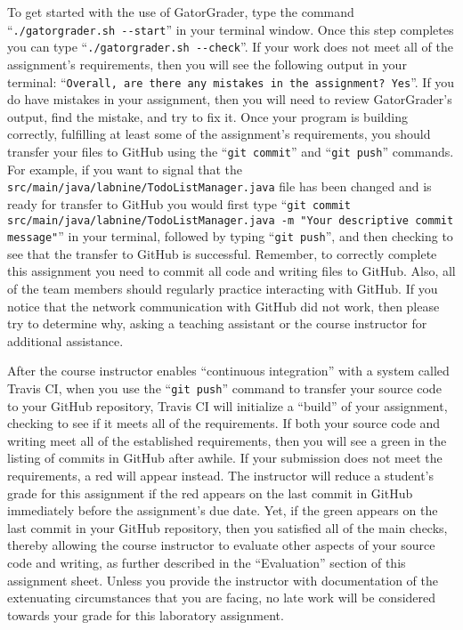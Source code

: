 \documentclass[11pt]{article}
\newcommand{\mainprogramsource}{\lstinline{src/main/java/labnine/TodoListManager.java}}
\newcommand{\gatorgraderstart}{\command{./gatorgrader.sh --start}}
\newcommand{\gatorgradercheck}{\command{./gatorgrader.sh --check}}
\newcommand{\gitcommit}{\command{git commit}}
\newcommand{\gitpush}{\command{git push}}
\newcommand{\gitcommitmainprogram}{\command{git commit src/main/java/labnine/TodoListManager.java -m "Your
descriptive commit message"}}
\newcommand{\command}[1]{``\lstinline{#1}''}
\newcommand{\step}[1]{``{#1}''}
\newcommand{\checkmark}{\ding{51}}
\newcommand{\naughtmark}{\ding{55}}
\begin{document}
To get started with the use of GatorGrader, type the command \gatorgraderstart{} in your terminal window. Once this step
completes you can type \gatorgradercheck{}. If your work does not meet all of the assignment's requirements, then you
will see the following output in your terminal: \command{Overall, are there any mistakes in the assignment? Yes}. If you
do have mistakes in your assignment, then you will need to review GatorGrader's output, find the mistake, and try to fix
it. Once your program is building correctly, fulfilling at least some of the assignment's requirements, you should
transfer your files to GitHub using the \gitcommit{} and \gitpush{} commands. For example, if you want to signal that
the \mainprogramsource{} file has been changed and is ready for transfer to GitHub you would first type
\gitcommitmainprogram{} in your terminal, followed by typing \gitpush{}, and then checking to see that the transfer to
GitHub is successful. Remember, to correctly complete this assignment you need to commit all code and writing files to
GitHub. Also, all of the team members should regularly practice interacting with GitHub. If you notice that the network
communication with GitHub did not work, then please try to determine why, asking a teaching assistant or the course
instructor for additional assistance.

After the course instructor enables \step{continuous integration} with a system called Travis CI, when you use the
\gitpush{} command to transfer your source code to your GitHub repository, Travis CI will initialize a \step{build} of
your assignment, checking to see if it meets all of the requirements. If both your source code and writing meet all of
the established requirements, then you will see a green \checkmark{} in the listing of commits in GitHub after awhile.
If your submission does not meet the requirements, a red \naughtmark{} will appear instead. The instructor will reduce a
student's grade for this assignment if the red \naughtmark{} appears on the last commit in GitHub immediately before the
assignment's due date. Yet, if the green \checkmark{} appears on the last commit in your GitHub repository, then you
satisfied all of the main checks, thereby allowing the course instructor to evaluate other aspects of your source code
and writing, as further described in the \step{Evaluation} section of this assignment sheet. Unless you provide the
instructor with documentation of the extenuating circumstances that you are facing, no late work will be considered
towards your grade for this laboratory assignment.
\end{document}
